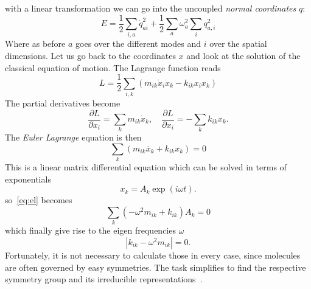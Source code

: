 with a linear transformation we can go into the uncoupled \textit{normal coordinates} $q$:
\begin{equation}
    E = \frac{1}{2} \sum_{i,a} \dot{q}^2_{ai} + \frac{1}{2} \sum_a \omega_a^2 \sum_i q^2_{a,i} 
\end{equation}
Where as before $a$ goes over the different modes and $i$ over the spatial dimensions.
Let us go back to the coordinates $x$ and look at the solution of the classical equation
of motion. The Lagrange function reads
\begin{equation}
    L = \frac{1}{2} \sum_{i,k} (m_{ik} \dot{x}_i\dot{x}_k -  k_{ik} x_i x_k   )
\end{equation}
The partial derivatives become 
\begin{equation}
    \frac{\partial L}{\partial \dot{x}_i} = \sum_k m_{ik} \dot{x}_k , \quad 
    \frac{\partial L}{\partial x_i} = - \sum_k k_{ik} x_k.
\end{equation}
The \textit{Euler Lagrange} equation is then 
\begin{equation}
    \label{eq:el}
    \sum_k (m_{ik} \ddot{x_k} + k_{ik} x_k) = 0 
\end{equation}
This is a linear matrix differential equation which can be solved in terms of exponentials
\begin{equation}
    x_k = A_k \exp(i\omega t).
\end{equation}
so~\eqref{eq:el} becomes
\begin{equation}
    \sum_k \left( -\omega^2 m_{ik} + k_{ik} \right)A_k = 0
\end{equation}
which finally give rise to the eigen frequencies $\omega$
\begin{equation}
    |k_{ik} - \omega^2 m_{ik}| = 0. 
\end{equation}
Fortunately, it is not necessary to calculate those in every case, since
molecules are often governed by easy symmetries. The task simplifies to
find the respective symmetry group and its irreducible representations~\cite{landau1977quantum}. 


